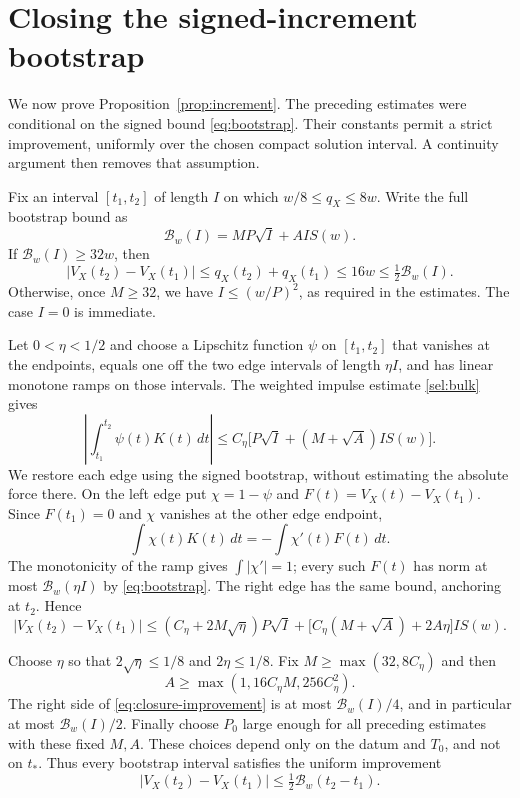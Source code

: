 \section{Closing the signed-increment bootstrap}\label{sec:closure}
We now prove Proposition~\ref{prop:increment}. The preceding estimates
were conditional on the signed bound \eqref{eq:bootstrap}. Their
constants permit a strict improvement, uniformly over the chosen
compact solution interval. A continuity argument then removes that
assumption.

Fix an interval $[t_1,t_2]$ of length $I$ on which
$w/8\le q_X\le8w$. Write the full bootstrap bound as
\[
 \mathcal B_w(I)=MP\sqrt I+A I S(w).
\]
If $\mathcal B_w(I)\ge32w$, then
\[
 |V_X(t_2)-V_X(t_1)|\le q_X(t_2)+q_X(t_1)
 \le16w\le\tfrac12\mathcal B_w(I).
\]
Otherwise, once $M\ge32$, we have $I\le(w/P)^2$, as required in
the estimates. The case $I=0$ is immediate.

Let $0<\eta<1/2$ and choose a Lipschitz function $\psi$ on
$[t_1,t_2]$ that vanishes at the endpoints, equals one off the two
edge intervals of length $\eta I$, and has linear monotone ramps on those
intervals. The weighted impulse estimate \eqref{sel:bulk} gives
\begin{equation}\label{eq:closure-bulk}
 \left|\int_{t_1}^{t_2}\psi(t)K(t)\,dt\right|
 \le C_\eta\bigl[P\sqrt I+(M+\sqrt A)I S(w)\bigr].
\end{equation}
We restore each edge using the signed bootstrap, without estimating
the absolute force there. On the left edge put $\chi=1-\psi$ and
$F(t)=V_X(t)-V_X(t_1)$. Since $F(t_1)=0$ and $\chi$ vanishes
at the other edge endpoint,
\[
 \int\chi(t)K(t)\,dt=-\int\chi'(t)F(t)\,dt.
\]
The monotonicity of the ramp gives $\int|\chi'|=1$; every such
$F(t)$ has norm at most $\mathcal B_w(\eta I)$ by
\eqref{eq:bootstrap}. The right edge has the same bound, anchoring
at $t_2$. Hence
\begin{equation}\label{eq:closure-improvement}
 |V_X(t_2)-V_X(t_1)|
 \le (C_\eta+2M\sqrt\eta)P\sqrt I
  +\bigl[C_\eta(M+\sqrt A)+2A\eta\bigr]I S(w).
\end{equation}

Choose $\eta$ so that $2\sqrt\eta\le1/8$ and $2\eta\le1/8$.
Fix $M\ge\max(32,8C_\eta)$ and then
\[
 A\ge\max(1,16C_\eta M,256C_\eta^2).
\]
The right side of \eqref{eq:closure-improvement} is at most
$\mathcal B_w(I)/4$, and in particular at most
$\mathcal B_w(I)/2$. Finally choose $P_0$ large enough for all
preceding estimates with these fixed $M,A$. These choices depend
only on the datum and $T_0$, and not on $t_*$.
Thus every bootstrap interval satisfies the uniform improvement
\begin{equation}\label{eq:strict-improvement}
 |V_X(t_2)-V_X(t_1)|\le\tfrac12\mathcal B_w(t_2-t_1).
\end{equation}

